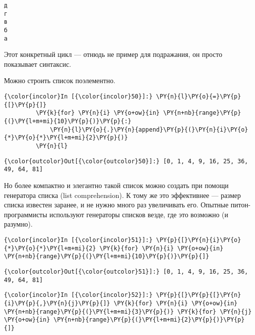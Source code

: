     \begin{Verbatim}[commandchars=\\\{\}]
д
г
в
б
а

    \end{Verbatim}

    Этот конкретный цикл --- отнюдь не пример для подражания, он просто
показывает синтаксис.

Можно строить список поэлементно.

    \begin{Verbatim}[commandchars=\\\{\}]
{\color{incolor}In [{\color{incolor}50}]:} \PY{n}{l}\PY{o}{=}\PY{p}{[}\PY{p}{]}
         \PY{k}{for} \PY{n}{i} \PY{o+ow}{in} \PY{n+nb}{range}\PY{p}{(}\PY{l+m+mi}{10}\PY{p}{)}\PY{p}{:}
             \PY{n}{l}\PY{o}{.}\PY{n}{append}\PY{p}{(}\PY{n}{i}\PY{o}{*}\PY{o}{*}\PY{l+m+mi}{2}\PY{p}{)}
         \PY{n}{l}
\end{Verbatim}

            \begin{Verbatim}[commandchars=\\\{\}]
{\color{outcolor}Out[{\color{outcolor}50}]:} [0, 1, 4, 9, 16, 25, 36, 49, 64, 81]
\end{Verbatim}
        
    Но более компактно и элегантно такой список можно создать при помощи
генератора списка (list comprehension). К тому же это эффективнее ---
размер списка известен заранее, и не нужно много раз увеличивать его.
Опытные питон-программисты используют генераторы списков везде, где это
возможно (и разумно).

    \begin{Verbatim}[commandchars=\\\{\}]
{\color{incolor}In [{\color{incolor}51}]:} \PY{p}{[}\PY{n}{i}\PY{o}{*}\PY{o}{*}\PY{l+m+mi}{2} \PY{k}{for} \PY{n}{i} \PY{o+ow}{in} \PY{n+nb}{range}\PY{p}{(}\PY{l+m+mi}{10}\PY{p}{)}\PY{p}{]}
\end{Verbatim}

            \begin{Verbatim}[commandchars=\\\{\}]
{\color{outcolor}Out[{\color{outcolor}51}]:} [0, 1, 4, 9, 16, 25, 36, 49, 64, 81]
\end{Verbatim}
        
    \begin{Verbatim}[commandchars=\\\{\}]
{\color{incolor}In [{\color{incolor}52}]:} \PY{p}{[}\PY{p}{[}\PY{n}{i}\PY{p}{,}\PY{n}{j}\PY{p}{]} \PY{k}{for} \PY{n}{i} \PY{o+ow}{in} \PY{n+nb}{range}\PY{p}{(}\PY{l+m+mi}{3}\PY{p}{)} \PY{k}{for} \PY{n}{j} \PY{o+ow}{in} \PY{n+nb}{range}\PY{p}{(}\PY{l+m+mi}{2}\PY{p}{)}\PY{p}{]}
\end{Verbatim}


